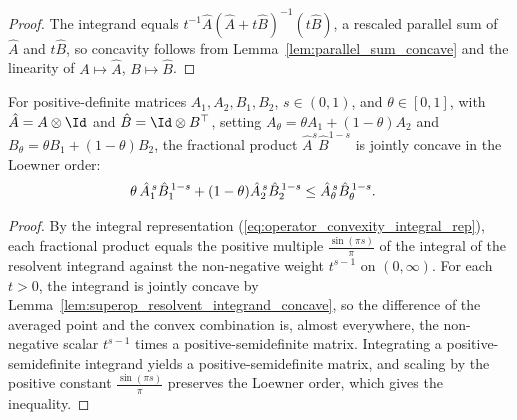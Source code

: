 \begin{proof}\leanok
    The integrand equals
    $t^{-1} \hat A(\hat A+t\hat B)^{-1}(t\hat B)$, a rescaled parallel sum of
    $\hat A$ and $t\hat B$, so concavity follows from
    Lemma~\ref{lem:parallel_sum_concave} and the linearity of
    $A\mapsto\hat A$, $B\mapsto\hat B$.
\end{proof}

\begin{lemma}\label{lem:op_lieb_concave}
    \leanok
    For positive-definite matrices $A_1,A_2,B_1,B_2$, $s\in(0,1)$, and
    $\theta\in[0,1]$, with $\hat{A}=A\otimes\Id$ and
    $\hat{B}=\Id\otimes B^\top$, setting
    $A_\theta=\theta A_1+(1-\theta)A_2$ and
    $B_\theta=\theta B_1+(1-\theta)B_2$, the fractional product
    $\hat A^s\hat B^{1-s}$ is jointly concave in the Loewner order:
    \begin{align}
        \theta\,\hat A_1^{\,s}\hat B_1^{\,1-s}
        +(1-\theta) \hat A_2^{\,s}\hat B_2^{\,1-s}
        &\le
        \hat A_\theta^{\,s}\hat B_\theta^{\,1-s}.
        \notag
    \end{align}
\end{lemma}

\begin{proof}\leanok
    By the integral representation (\ref{eq:operator_convexity_integral_rep}),
    each fractional product equals the positive multiple
    $\frac{\sin(\pi s)}{\pi}$ of the integral of the resolvent integrand
    against the non-negative weight $t^{s-1}$ on $(0,\infty)$. For each $t>0$,
    the integrand is jointly concave by
    Lemma~\ref{lem:superop_resolvent_integrand_concave}, so the difference of
    the averaged point and the convex combination is, almost everywhere, the
    non-negative scalar $t^{s-1}$ times a positive-semidefinite matrix.
    Integrating a positive-semidefinite integrand yields a positive-semidefinite
    matrix, and scaling by the positive constant
    $\frac{\sin(\pi s)}{\pi}$ preserves the Loewner order, which gives the
    inequality.
\end{proof}

